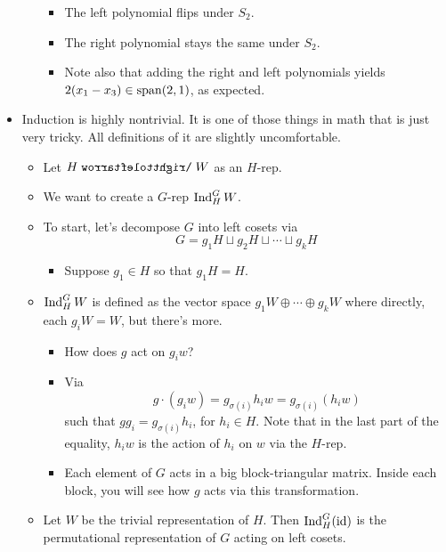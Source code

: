 \documentclass[../notes.tex]{subfiles}
\begin{document}
\begin{itemize}
\begin{itemize}
        \begin{itemize}
            \item The left polynomial flips under $S_2$.
            \item The right polynomial stays the same under $S_2$.
            \item Note also that adding the right and left polynomials yields $2(x_1-x_3)\in\operatorname{span}(2,1)$, as expected.
        \end{itemize}
    \end{itemize}
    \item Induction is highly nontrivial. It is one of those things in math that is just very tricky. All definitions of it are slightly uncomfortable.
    \begin{itemize}
        \item Let $H\acts W$ as an $H$-rep.
        \item We want to create a $G$-rep $\operatorname{Ind}_H^GW$.
        \item To start, let's decompose $G$ into left cosets via
        \begin{equation*}
            G = g_1H\sqcup g_2H\sqcup\cdots\sqcup g_kH
        \end{equation*}
        \begin{itemize}
            \item Suppose $g_1\in H$ so that $g_1H=H$.
        \end{itemize}
        \item $\operatorname{Ind}_H^GW$ is defined as the vector space $g_1W\oplus\cdots\oplus g_kW$ where directly, each $g_iW=W$, but there's more.
        \begin{itemize}
            \item How does $g$ act on $g_iw$?
            \item Via
            \begin{equation*}
                g\cdot(g_iw) = g_{\sigma(i)}h_iw
                = g_{\sigma(i)}(h_iw)
            \end{equation*}
            such that $gg_i=g_{\sigma(i)}h_i$, for $h_i\in H$. Note that in the last part of the equality, $h_iw$ is the action of $h_i$ on $w$ via the $H$-rep.
            \item Each element of $G$ acts in a big block-triangular matrix. Inside each block, you will see how $g$ acts via this transformation.
        \end{itemize}
        \item Let $W$ be the trivial representation of $H$. Then $\operatorname{Ind}_H^G(\operatorname{id})$ is the permutational representation of $G$ acting on left cosets.

\end{itemize}
\end{itemize}
\end{document}
